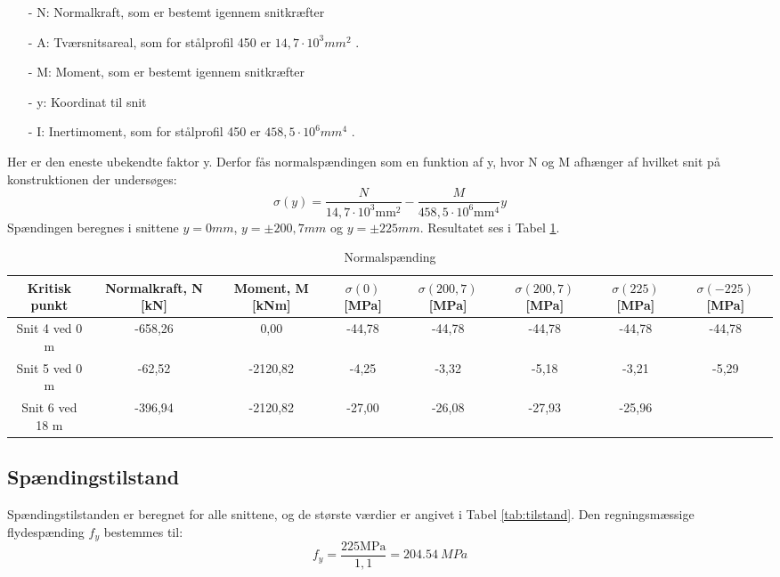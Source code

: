 \begin{itemize}
	\item[-] N: Normalkraft, som er bestemt igennem snitkræfter
	\item[-] A: Tværsnitsareal, som for stålprofil 450 er $14,\!7 \cdot 10^3 mm^2$ \citep{stabi}. 
	\item[-] M: Moment, som er bestemt igennem snitkræfter
	\item[-] y: Koordinat til snit
	\item[-] I: Inertimoment, som for stålprofil 450 er $458,\!5 \cdot 10^6 mm^4$ \citep{stabi}. 
\end{itemize} 

Her er den eneste ubekendte faktor y. Derfor fås normalspændingen som en funktion af y, hvor N og M afhænger af hvilket snit på konstruktionen der undersøges:
\begin{equation}
	\sigma(y) = \frac{N}{14,\!7 \cdot 10^3 \text{mm}^2} - \frac{M}{458,\!5 \cdot 10^6 \text{mm}^4} y
\end{equation}
Spændingen beregnes i snittene $y = 0 mm$, $y = \pm 200,\!7 mm$ og $y = \pm 225 mm$. Resultatet ses i Tabel \ref{tab:normalspanding}.

\begin{table} [H]
	\begin{center}
		\begin{tabular}{c c c c c c c c }
			\hline
			Kritisk punkt   & Normalkraft, N [kN] & Moment, M [kNm] & $\sigma(0)$[MPa] & $\sigma(200,7)$[MPa] & $\sigma(200,7)$[MPa] & $\sigma(225)$[MPa] & $\sigma(-225)$[MPa] \\ \hline
			Snit 4 ved 0 m  & -658,26           & 0,00                   & -44,78      & -44,78          & -44,78          & -44,78        & -44,78       \\ \hline
			Snit 5 ved 0 m  & -62,52          & -2120,82      & -4,25     & -3,32         & -5,18          & -3,21        & -5,29        \\ \hline
			Snit 6 ved 18 m & -396,94           & -2120,82        & -27,00      & -26,08         & -27,93          & -25,96        &                      \\ \hline
		\end{tabular}
		\caption{Normalspænding}
		\label{tab:normalspanding}
	\end{center}
\end{table}

\subsection{Spændingstilstand}
Spændingstilstanden er beregnet for alle snittene, og de største værdier er angivet i Tabel \ref{tab:tilstand}.
\newline
\newline
Den regningsmæssige flydespænding $f_y$ bestemmes til:
\begin{equation}
f_y = \frac{225 \text{MPa}}{1,\!1} = \SI{204,54}{MPa}
\end{equation}

